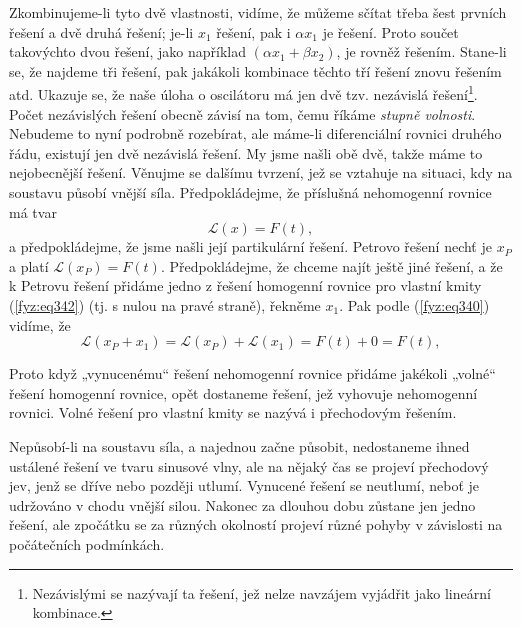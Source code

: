     
    Zkombinujeme-li tyto dvě vlastnosti, vidíme, že můžeme sčítat třeba šest prvních řešení a dvě 
    druhá řešení; je-li \(x_1\) řešení, pak i \(\alpha x_1\) je řešení. Proto součet takovýchto 
    dvou řešení, jako například \((\alpha x_1 + \beta x_2 )\), je rovněž řešením. Stane-li se, že 
    najdeme tři řešení, pak jakákoli kombinace těchto tří řešení znovu řešením atd. Ukazuje se, že 
    naše úloha o oscilátoru má jen dvě tzv. nezávislá řešení\footnote{Nezávislými se nazývají ta 
    řešení, jež nelze navzájem vyjádřit jako lineární kombinace.}. Počet nezávislých řešení obecně 
    závisí na tom, čemu říkáme \emph{stupně volnosti}. Nebudeme to nyní podrobně rozebírat, ale 
    máme-li diferenciální rovnici druhého řádu, existují jen dvě nezávislá řešení. My jsme našli 
    obě dvě, takže máme to nejobecnější řešení. Věnujme se dalšímu tvrzení, jež se vztahuje na 
    situaci, kdy na soustavu působí vnější síla. Předpokládejme, že příslušná nehomogenní rovnice 
    má tvar
    \begin{equation}\label{fyz:eq343}
      \mathscr{L}(x) = F(t),
    \end{equation}
    a předpokládejme, že jsme našli její partikulární řešení. Petrovo řešení nechť je \(x_P\) a 
    platí \(\mathscr{L}(x_P) = F(t)\). Předpokládejme, že chceme najít ještě jiné řešení, a že k 
    Petrovu řešení přidáme jedno z řešení homogenní rovnice pro vlastní kmity (\ref{fyz:eq342}) 
    (tj. s nulou na pravé straně), řekněme \(x_1\). Pak podle (\ref{fyz:eq340}) vidíme, že
    \begin{equation}\label{fyz:eq344}
      \mathscr{L}(x_P + x_1) = \mathscr{L}(x_P) + \mathscr{L}(x_1) = F(t) + 0 = F(t),
    \end{equation}
    
    Proto když „vynucenému“ řešení nehomogenní rovnice přidáme jakékoli „volné“ řešení homogenní 
    rovnice, opět dostaneme řešení, jež vyhovuje nehomogenní rovnici. Volné řešení pro vlastní 
    kmity se nazývá i přechodovým řešením. 
    
    Nepůsobí-li na soustavu síla, a najednou začne působit, nedostaneme ihned ustálené řešení ve 
    tvaru sinusové vlny, ale na nějaký čas se projeví přechodový jev, jenž se dříve nebo později 
    utlumí. Vynucené řešení se neutlumí, neboť je udržováno v chodu vnější silou. Nakonec za 
    dlouhou dobu zůstane jen jedno řešení, ale zpočátku se za různých okolností projeví různé 
    pohyby v závislosti na počátečních podmínkách.
    
